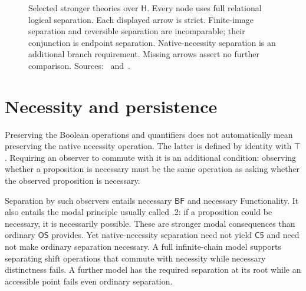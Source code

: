 \documentclass[12pt,letterpaper]{article}
\newcommand{\Hlogic}{\mathsf{H}}
\newcommand{\Cfive}{\mathsf{C5}}
\newcommand{\BF}{\mathsf{BF}}
\newcommand{\OS}{\mathsf{OS}}
\begin{document}
\begin{figure}[htbp]
\centering
{}

\caption{Selected stronger theories over $\Hlogic$. Every node uses full relational logical separation. Each displayed arrow is strict. Finite-image separation and reversible separation are incomparable; their conjunction is endpoint separation. Native-necessity separation is an additional branch requirement. Missing arrows assert no further comparison. Sources:~\cite[\S\S3--7]{r9} and~\cite[\S7]{r10}.}
\end{figure}

\section{Necessity and persistence}

Preserving the Boolean operations and quantifiers does not automatically mean preserving the native necessity operation. The latter is defined by identity with $\top$. Requiring an observer to commute with it is an additional condition: observing whether a proposition is necessary must be the same operation as asking whether the observed proposition is necessary.


Separation by such observers entails necessary $\BF$ and necessary Functionality. It also entails the modal principle usually called .2: if a proposition could be necessary, it is necessarily possible. These are stronger modal consequences than ordinary $\OS$ provides. Yet native-necessity separation need not yield $\Cfive$ and need not make ordinary separation necessary. A full infinite-chain model supports separating shift operations that commute with necessity while necessary distinctness fails. A further model has the required separation at its root while an accessible point fails even ordinary separation.~\cite[\S\S2, 5--6]{r10}
\end{document}
